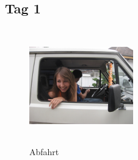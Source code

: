 % 

\subsection{Tag 1}

\begin{figure} 
  \begin{centering}
    \includegraphics[width=0.4\textwidth, height=5cm, keepaspectratio]{../Bilder/Flims/2.jpg}
    \caption{Abfahrt}
  \end{centering}
\end{figure} 

